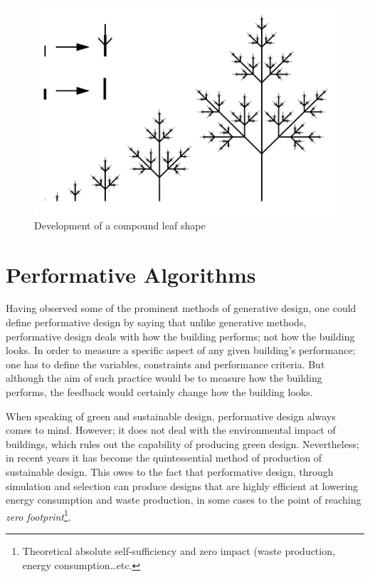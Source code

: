 \begin{figure}[h]
\centering
\includegraphics[width=\textwidth]{./Images/15-L-SystemLeaf}
\caption[L-System Compound Leaf]{Development of a compound leaf shape \cite{csiro96}}
\label{LSysLeaf}
\end{figure}

\clearpage
\section{Performative Algorithms}

Having observed some of the prominent methods of generative design, one could define performative design by saying that unlike generative methods, performative design deals with how the building performs; not how the building looks. In order to measure a specific aspect of any given building's performance; one has to define the variables, constraints and performance criteria. But although the aim of such practice would be to measure how the building performs, the feedback would certainly change how the building looks.

When speaking of green and sustainable design, performative design always comes to mind. However; it does not deal with the environmental impact of buildings, which rules out the capability of producing green design. Nevertheless; in recent years it has become the quintessential method of production of sustainable design. This owes to the fact that performative design, through simulation and selection can produce designs that are highly efficient at lowering energy consumption and waste production, in some cases to the point of reaching \emph{zero footprint}\footnote{Theoretical absolute self-sufficiency and zero impact (waste production, energy consumption\ldots etc.}.

